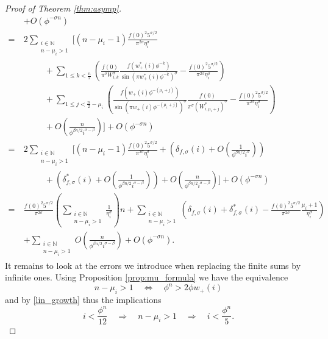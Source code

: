 \documentclass[]{interact}
\newcommand{\bbN}{\mathbb{N}}
\theoremstyle{definition}
\numberwithin{table}{section} %
\numberwithin{figure}{section}
\begin{document}
\begin{proof}[Proof of Theorem \ref{thm:asymp}]
\begin{align*}
        & + O(\phi^{-\sigma n}) \\
        = ~& 2\sum_{\substack{i \in \bbN \\ n-\mu_i > 1}} \Bigg[ (n-\mu_i-1) \frac{f(0)^2 5^{\sigma/2}}{\pi^{2\sigma} \eta_i^\sigma} \\
        & ~~~~~~~~~~~ + \sum_{1 \leq k < \frac n2} \left(\frac{f(0)}{\pi^\sigma W_{i, k}^\sigma} \frac{f(w_+^*(i) \phi^{-k})}{{\sin(\pi w_+^*(i) \phi^{-k})}^\sigma} - \frac{f(0)^2 5^{\sigma/2}}{\pi^{2\sigma} \eta_i^\sigma}\right) \\
        & ~~~~~~~~~~~ + \sum_{1 \leq j < \frac n2 - \mu_i} \left(\frac{f(w_+(i) \phi^{-(\mu_i+j)})}{{\sin(\pi w_+(i) \phi^{-(\mu_i+j)})}^\sigma} \frac{f(0)}{\pi^\sigma (W_{i, \mu_i+j}^*)^\sigma} - \frac{f(0)^2 5^{\sigma/2}}{\pi^{2\sigma} \eta_i^\sigma}\right) \\
        & ~~~~~~~~~~~ + O\left(\frac{n}{\phi^{\beta n/2} i^{\sigma-\beta}}\right) \Bigg] + O(\phi^{-\sigma n}) \\
        = ~& 2\sum_{\substack{i \in \bbN \\ n-\mu_i > 1}} \Bigg[ (n-\mu_i-1) \frac{f(0)^2 5^{\sigma/2}}{\pi^{2\sigma} \eta_i^\sigma} + \left(\delta_{f, \sigma}(i) + O\left(\frac1{\phi^{\beta n/2} i^\sigma}\right)\right) \\
        & ~~~~~~~~~~~ + \left(\delta_{f, \sigma}^*(i) + O\left(\frac1{\phi^{\beta n/2} i^{\sigma-\beta}}\right)\right) + O\left(\frac{n}{\phi^{\beta n/2} i^{\sigma-\beta}}\right) \Bigg] + O(\phi^{-\sigma n}) \\
        = ~& \frac{f(0)^2 5^{\sigma/2}}{\pi^{2\sigma}} \left(\sum_{\substack{i \in \bbN \\ n-\mu_i > 1}} \frac1{\eta_i^\sigma}\right) n + \sum_{\substack{i \in \bbN \\ n-\mu_i > 1}} \left(\delta_{f, \sigma}(i) + \delta_{f, \sigma}^*(i) - \frac{f(0)^2 5^{\sigma/2}}{\pi^{2\sigma}} \frac{\mu_i+1}{\eta_i^\sigma}\right) \\
        & + \sum_{\substack{i \in \bbN \\ n-\mu_i > 1}}O\left(\frac{n}{\phi^{\beta n/2} i^{\sigma-\beta}}\right) + O(\phi^{-\sigma n}).
    \end{align*}
    It remains to look at the errors we introduce when replacing the finite sums by infinite ones. Using Proposition \ref{prop:mu_formula} we have the equivalence
    $$
    n - \mu_i > 1 \quad \Leftrightarrow \quad \phi^n > 2\phi w_+(i)
    $$
    and by \eqref{lin_growth} thus the implications
    $$
    i < \frac{\phi^n}{12} \quad \Rightarrow \quad n-\mu_i > 1 \quad \Rightarrow \quad i < \frac{\phi^n}{5}.
$$
\end{proof}
\end{document}
